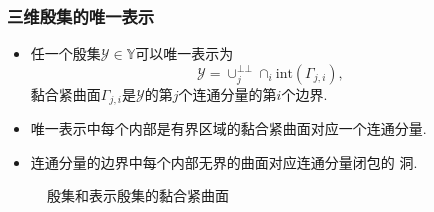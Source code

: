 \documentclass[UTF8]{ctexbeamer}	%
\theoremstyle{plain}
\theoremstyle{definition}
\theoremstyle{remark}
\numberwithin{equation}{section}
\begin{document}
\begin{frame}
    \frametitle{三维殷集的唯一表示}
    \begin{itemize}
        \item 任一个殷集$\mathcal{Y} \in \mathbb{Y}$可以唯一表示为
              \[\mathcal{Y} = \cup_j^{\bot \bot} \cap_i \text{int}(\Gamma_{j, i}),\]
              黏合紧曲面$\Gamma_{j, i}$是$\mathcal{Y}$的第$j$个连通分量的第$i$个边界.
        \item 唯一表示中每个内部是有界区域的黏合紧曲面对应一个连通分量.

        \item 连通分量的边界中每个内部无界的曲面对应连通分量闭包的
              洞.
    \end{itemize}
    \begin{figure}[htbp]
        \centering
         \qquad
        \caption{殷集和表示殷集的黏合紧曲面}
        \vspace{0.2in}
    \end{figure}
\end{frame}
\end{document}

